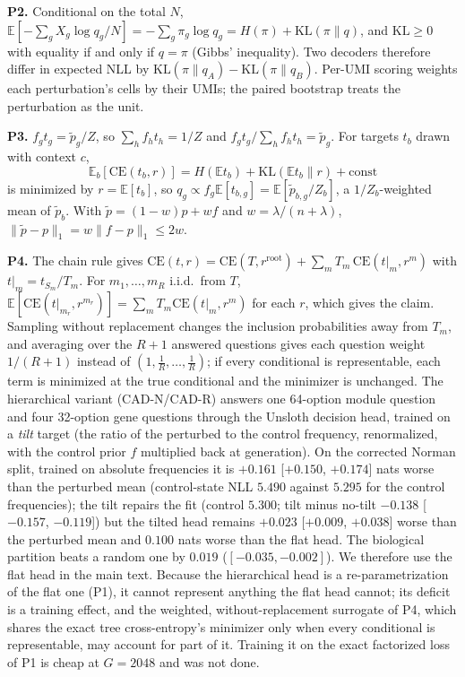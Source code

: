 \documentclass[10pt]{article}
\makeatletter
\newcommand{\cadn}{CAD-N}
\newcommand{\cadr}{CAD-R}
\renewcommand\section{\@startsection{section}{1}{\z@}{-3.5ex \@plus -1ex \@minus -.2ex}{2.3ex \@plus.2ex}{\normalfont\Large\bfseries\raggedright\hyphenpenalty=10000}}
\makeatother
\begin{document}
\textbf{P2.} Conditional on the total $N$, $\mathbb{E}[-\sum_gX_g\log q_g/N]=-\sum_g\pi_g\log q_g=H(\pi)+\mathrm{KL}(\pi\|q)$, and $\mathrm{KL}\ge0$ with equality if and only if $q=\pi$ (Gibbs' inequality). Two decoders therefore differ in expected NLL by $\mathrm{KL}(\pi\|q_A)-\mathrm{KL}(\pi\|q_B)$. Per-UMI scoring weights each perturbation's cells by their UMIs; the paired bootstrap treats the perturbation as the unit.

\textbf{P3.} $f_gt_g=\tilde p_g/Z$, so $\sum_hf_ht_h=1/Z$ and $f_gt_g/\sum_hf_ht_h=\tilde p_g$. For targets $t_b$ drawn with context $c$, \[\mathbb{E}_b[\mathrm{CE}(t_b,r)]=H(\mathbb{E}t_b)+\mathrm{KL}(\mathbb{E}t_b\|r)+\text{const}\] is minimized by $r=\mathbb{E}[t_b]$, so $q_g\propto f_g\mathbb{E}[t_{b,g}]=\mathbb{E}[\tilde p_{b,g}/Z_b]$, a $1/Z_b$-weighted mean of $\tilde p_b$. With $\tilde p=(1-w)p+wf$ and $w=\lambda/(n+\lambda)$, $\lVert\tilde p-p\rVert_1=w\lVert f-p\rVert_1\le2w$.

\textbf{P4.} The chain rule gives $\mathrm{CE}(t,r)=\mathrm{CE}(T,r^{\mathrm{root}})+\sum_mT_m\,\mathrm{CE}(t|_m,r^m)$ with $t|_m=t_{S_m}/T_m$. For $m_1,\dots,m_R$ i.i.d.\ from $T$, $\mathbb{E}[\mathrm{CE}(t|_{m_r},r^{m_r})]=\sum_mT_m\mathrm{CE}(t|_m,r^m)$ for each $r$, which gives the claim. Sampling without replacement changes the inclusion probabilities away from $T_m$, and averaging over the $R{+}1$ answered questions gives each question weight $1/(R{+}1)$ instead of $(1,\tfrac1R,\dots,\tfrac1R)$; if every conditional is representable, each term is minimized at the true conditional and the minimizer is unchanged.
\section{Hierarchical decision head (ablation)}\label{app:tree}
The hierarchical variant (\cadn{}/\cadr{}) answers one 64-option module question and four 32-option gene questions through the Unsloth decision head, trained on a \emph{tilt} target (the ratio of the perturbed to the control frequency, renormalized, with the control prior $f$ multiplied back at generation). On the corrected Norman split, trained on absolute frequencies it is $+0.161$ [$+0.150$, $+0.174$] nats worse than the perturbed mean (control-state NLL $5.490$ against $5.295$ for the control frequencies); the tilt repairs the fit (control $5.300$; tilt minus no-tilt $-0.138$ [$-0.157$, $-0.119$]) but the tilted head remains $+0.023$ [$+0.009$, $+0.038$] worse than the perturbed mean and $0.100$ nats worse than the flat head. The biological partition beats a random one by $0.019$ ($[-0.035,-0.002]$). We therefore use the flat head in the main text. Because the hierarchical head is a re-parametrization of the flat one (P1), it cannot represent anything the flat head cannot; its deficit is a training effect, and the weighted, without-replacement surrogate of P4, which shares the exact tree cross-entropy's minimizer only when every conditional is representable, may account for part of it. Training it on the exact factorized loss of P1 is cheap at $G=2048$ and was not done.
\end{document}
